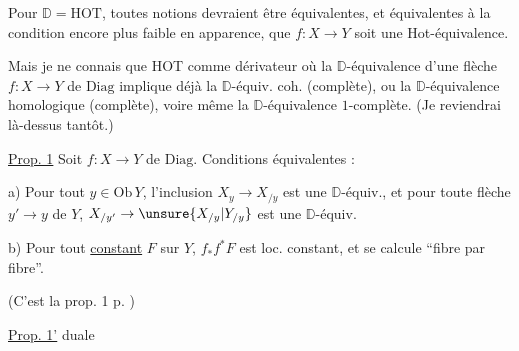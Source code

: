 


Pour  $\mathbb D=\mathrm{HOT}$, toutes  notions devraient être équivalentes, et équivalentes  à la condition encore plus faible en apparence, que $f:X\to Y$ soit une Hot-équivalence.

Mais je ne connais que HOT comme dérivateur où la $\mathbb D$-équivalence d'une flèche $f:X\to Y$ de $\mathrm{Diag}$ implique déjà la $\mathbb D$-équiv. coh. (complète), ou la $\mathbb D$-équivalence homologique (complète), voire même la $\mathbb D$-équivalence $1$-complète. (Je reviendrai là-dessus tantôt.)

\uline{Prop. 1} Soit $f:X\to Y$ de $\mathrm{Diag}$. Conditions équivalentes :

a) Pour tout $y\in\mathrm{Ob}\,Y$, l'inclusion $X_y\to X_{/y}$ est une $\mathbb D$-équiv., et pour toute flèche $y'\to y$ de $Y$, $X_{/y'}\to\unsure{X_{/y}|Y_{/y}}$ est une $\mathbb D$-équiv.

b) Pour tout  \uline{constant} $F$ sur $Y$, $f_* f^* F$ est loc. constant, et se calcule ``fibre par fibre''.

(C'est la prop. 1 p. )

\uline{Prop. 1'} duale


